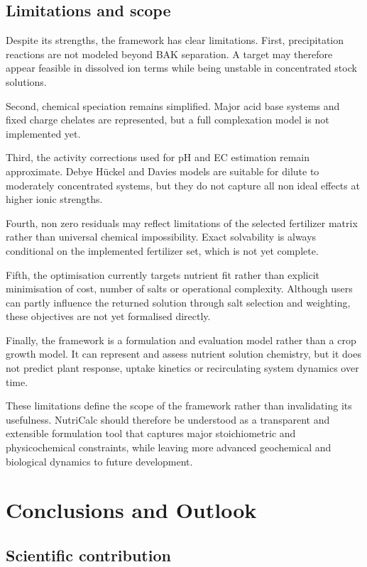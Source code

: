 \documentclass[
  letterpaper,
  DIV=11,
  numbers=noendperiod]{scrreprt}
\begin{document}
\section{Limitations and scope}\label{limitations-and-scope}

Despite its strengths, the framework has clear limitations. First,
precipitation reactions are not modeled beyond BAK separation. A target
may therefore appear feasible in dissolved ion terms while being
unstable in concentrated stock solutions.

Second, chemical speciation remains simplified. Major acid base systems
and fixed charge chelates are represented, but a full complexation model
is not implemented yet.

Third, the activity corrections used for pH and EC estimation remain
approximate. Debye Hückel and Davies models are suitable for dilute to
moderately concentrated systems, but they do not capture all non ideal
effects at higher ionic strengths.

Fourth, non zero residuals may reflect limitations of the selected
fertilizer matrix rather than universal chemical impossibility. Exact
solvability is always conditional on the implemented fertilizer set,
which is not yet complete.

Fifth, the optimisation currently targets nutrient fit rather than
explicit minimisation of cost, number of salts or operational
complexity. Although users can partly influence the returned solution
through salt selection and weighting, these objectives are not yet
formalised directly.

Finally, the framework is a formulation and evaluation model rather than
a crop growth model. It can represent and assess nutrient solution
chemistry, but it does not predict plant response, uptake kinetics or
recirculating system dynamics over time.

These limitations define the scope of the framework rather than
invalidating its usefulness. NutriCalc should therefore be understood as
a transparent and extensible formulation tool that captures major
stoichiometric and physicochemical constraints, while leaving more
advanced geochemical and biological dynamics to future development.

\chapter{Conclusions and Outlook}\label{conclusions-and-outlook}

\section{Scientific contribution}\label{scientific-contribution}
\end{document}
